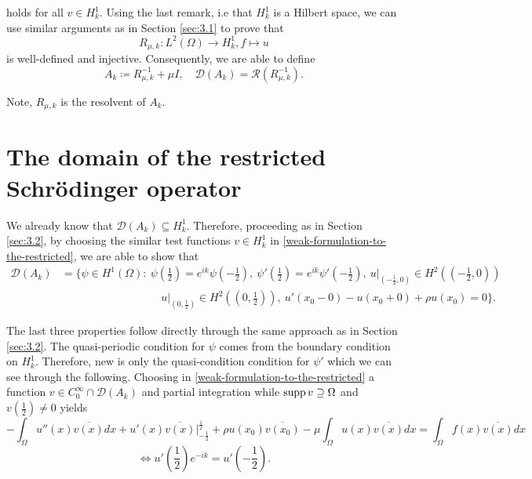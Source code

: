 holds for all $v \in H^{1}_{k}$. Using the last remark, i.e that $H^{1}_{k}$ is a Hilbert space, we can use similar arguments as in Section \ref{sec:3.1} to prove that 
	\[ R_{\mu, k} \colon L^{2}(\Omega) \rightarrow H^{1}_{k},  f \mapsto u \]
is well-defined and injective. Consequently, we are able to define
	\[ A_{k} \coloneqq R_{\mu, k}^{-1} + \mu I, \quad \mathcal{D}(A_{k}) = \mathcal{R}(R_{\mu, k}^{-1}). \] 
	
\begin{remark}
	Note, $R_{\mu, k}$ is the resolvent of $A_{k}$.
\end{remark}

\section{The domain of the restricted Schrödinger operator}

We already know that $\mathcal{D}(A_{k}) \subseteq H^{1}_{k}$. Therefore, proceeding as in Section \ref{sec:3.2}, by choosing the similar test functions $v \in H^{1}_{k}$ in \eqref{weak-formulation-to-the-restricted}, we are able to show that
\begin{align*}
	\mathcal{D}(A_{k}) & = \Big\{ \psi \in H^{1}(\Omega) \colon ~\psi\left(\frac{1}{2}\right) = e^{ik} \psi\left(-\frac{1}{2}\right), ~ \psi'\left(\frac{1}{2}\right) = e^{ik} \psi'\left(-\frac{1}{2}\right), ~ u\big|_{\left(-\frac{1}{2}, 0\right)} \in H^{2}\left(\left(-\frac{1}{2}, 0\right)\right) \\	
	 & ~\qquad ~\qquad ~\qquad ~\qquad ~ u\big|_{\left(0, \frac{1}{2}\right)} \in H^{2}\left(\left(0, \frac{1}{2}\right)\right), ~ u'(x_{0}-0) - u(x_{0} + 0) + \rho u(x_{0}) = 0 \Big\}. 
\end{align*}

The last three properties follow directly through the same approach as in Section \ref{sec:3.2}. The quasi-periodic condition for $\psi$ comes from the boundary condition on $H^{1}_{k}$. Therefore, new is only the quasi-condition condition for $\psi'$ which we can see through the following. Choosing in \eqref{weak-formulation-to-the-restricted} a function $v \in C_{0}^{\infty} \cap \mathcal{D}(A_{k})$ and partial integration while $\operatorname{supp} v \supseteq \Omega$ and $v\left(\frac{1}{2}\right) \neq 0$ yields
\[ - \int_{\Omega} u''(x) \overline{v(x)} dx +  u'(x) \overline{v(x)} \big|_{-\frac{1}{2}}^{\frac{1}{2}} + \rho u(x_{0}) \overline{v(x_{0})} - \mu \int_{\Omega} u(x) \overline{v(x)} dx = \int_{\Omega} f(x) \overline{v(x)} dx \] 
\[ \iff u'\left(\frac{1}{2}\right) e^{-ik} = u'\left(-\frac{1}{2}\right). \] %

